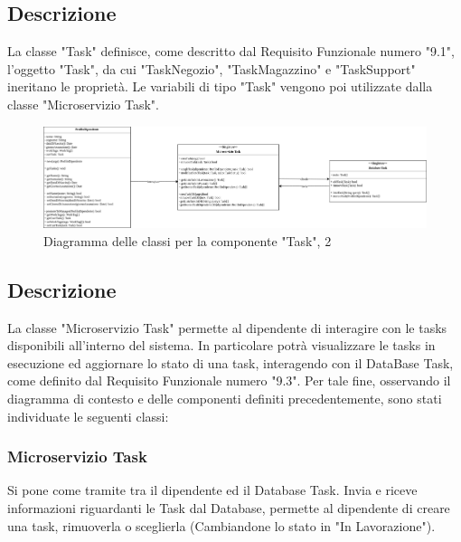 \documentclass{report}
\begin{document}
\subsection*{Descrizione}
La classe "Task" definisce, come descritto dal Requisito Funzionale numero "9.1", l'oggetto "Task", da cui "TaskNegozio", "TaskMagazzino" e "TaskSupport" ineritano le proprietà. Le variabili di tipo "Task" vengono poi utilizzate dalla classe "Microservizio Task".



\begin{figure}[H]
	\centering\includegraphics[width=1.2\textwidth]{third-deliverable/images/Diagramma_delle_classi_task2.png}
	Diagramma delle classi per la componente "Task", 2
\end{figure}
\subsection*{Descrizione}
La classe "Microservizio Task" permette al dipendente di interagire con le tasks disponibili all'interno del sistema. In particolare potrà visualizzare le tasks in esecuzione ed aggiornare lo stato di una task, interagendo con il DataBase Task, come definito dal Requisito Funzionale numero "9.3". Per tale fine, osservando il diagramma di contesto e delle componenti definiti precedentemente, sono stati individuate le seguenti classi: 

\subsubsection*{Microservizio Task}
Si pone come tramite tra il dipendente ed il Database Task. Invia e riceve informazioni riguardanti le Task dal Database, permette al dipendente di creare una task, rimuoverla o sceglierla (Cambiandone lo stato in "In Lavorazione").
\end{document}
